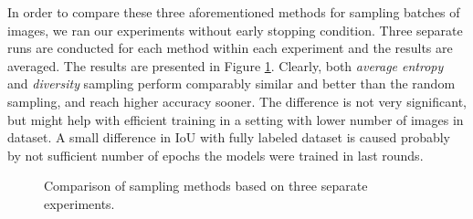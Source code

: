 In order to compare these three aforementioned methods for sampling batches of images,
we ran our experiments without early stopping condition. Three separate runs are conducted
for each method within each experiment and the results are averaged. The results are
presented in Figure \ref{img:method_comparison}. Clearly, both \textit{average entropy} and
\textit{diversity} sampling perform comparably similar and better than the random
sampling, and reach higher accuracy sooner. 
The difference is not very significant, but might help with efficient training in
a setting with lower number of images in dataset. A small difference in IoU with
fully labeled dataset is caused probably by not sufficient number of epochs the
models were trained in last rounds.

\begin{figure}[!h]
	\begin{center}
		\quad
	\end{center}
	\caption[Comparison of sampling methods]{Comparison of sampling methods based on three separate experiments.}
	\label{img:method_comparison}
\end{figure}

